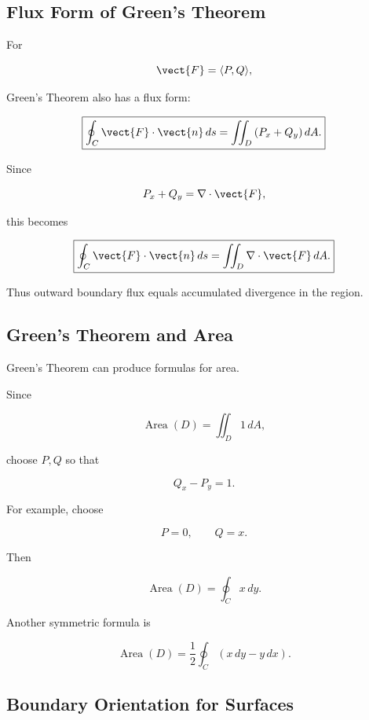 \subsection{Flux Form of Green's Theorem}
\label{subsec:greens-flux-form}

For

\[ \vect{F}=\langle P,Q\rangle, \]

Green's Theorem also has a flux form:

\[ \boxed{
\oint_C\vect{F}\cdot\vect{n}\,ds
=
\iint_D
\left(P_x+Q_y\right)dA.
} \]

Since

\[ P_x+Q_y=\nabla\cdot\vect{F}, \]

this becomes

\[ \boxed{
\oint_C\vect{F}\cdot\vect{n}\,ds
=
\iint_D\nabla\cdot\vect{F}\,dA.
} \]

Thus outward boundary flux equals accumulated divergence in the region.

\subsection{Green's Theorem and Area}
\label{subsec:greens-theorem-area}

Green's Theorem can produce formulas for area.

Since

\[ \operatorname{Area}(D)=\iint_D1\,dA, \]

choose \(P,Q\) so that

\[ Q_x-P_y=1. \]

For example, choose

\[ P=0,\qquad Q=x. \]

Then

\[ \boxed{\operatorname{Area}(D)=\oint_Cx\,dy.} \]

Another symmetric formula is

\[ \boxed{
\operatorname{Area}(D)
=
\frac12\oint_C(x\,dy-y\,dx).
} \]

\subsection{Boundary Orientation for Surfaces}
\label{subsec:boundary-orientation-surfaces}

